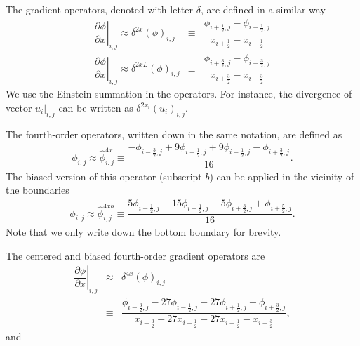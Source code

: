 \documentclass[gmd,manuscript]{copernicus}
\begin{document}
The gradient operators, denoted with letter $\delta$, are defined in a similar way
\begin{eqnarray}
\left. \dfrac{\partial \phi}{\partial x}\right|_{i,j} \approx \delta^{2x} \left( \phi \right)_{i,j} & \equiv & \dfrac{\phi_{i+\frac{1}{2},j} - \phi_{i-\frac{1}{2},j}}
                                                                                                                 {   x_{i+\frac{1}{2}}   -    x_{i-\frac{1}{2}  }} \\
\left. \dfrac{\partial \phi}{\partial x}\right|_{i,j} \approx \delta^{2xL} \left( \phi \right)_{i,j}& \equiv & \dfrac{\phi_{i+\frac{3}{2},j} - \phi_{i-\frac{3}{2},j}}
                                                                                                                  {   x_{i+\frac{3}{2}}   -    x_{i-\frac{3}{2}  }}
\end{eqnarray}
We use the Einstein summation in the operators. For instance, the divergence of vector $\left.u_i\right|_{i,j}$ can be written as $\delta^{2x_i}\left( u_i \right)_{i,j}$.
% 

The fourth-order operators, written down in the same notation, are defined as
\begin{eqnarray}
\phi_{i,j} \approx \widehat{\phi}^{4x}_{i,j} \equiv \dfrac{- \phi_{i-\frac{3}{2},j} + 9 \phi_{i-\frac{1}{2},j} + 9 \phi_{i+\frac{1}{2},j} - \phi_{i+\frac{3}{2},j}}{16}.\label{eq:interp4}
\end{eqnarray}
The biased version of this operator (subscript $b$) can be applied in the vicinity of the boundaries 
\begin{eqnarray}
\phi_{i,j} \approx \widehat{\phi}^{4xb}_{i,j} \equiv \dfrac{ 5 \phi_{i-\frac{1}{2},j} + 15 \phi_{i+\frac{1}{2},j} - 5 \phi_{i+\frac{3}{2},j} + \phi_{i+\frac{5}{2},j}}{16}.
\end{eqnarray}
Note that we only write down the bottom boundary for brevity.

The centered and biased fourth-order gradient operators are
\begin{eqnarray}
\nonumber
\left. \dfrac{\partial \phi}{\partial x}\right|_{i,j} & \approx & \delta^{4x} \left( \phi \right)_{i,j}\\
& \equiv & \dfrac{\phi_{i-\frac{3}{2},j} - 27 \phi_{i-\frac{1}{2},j} + 27 \phi_{i+\frac{1}{2},j} - \phi_{i+\frac{3}{2},j}}
             {       x_{i-\frac{3}{2}}   - 27    x_{i-\frac{1}{2}}   + 27    x_{i+\frac{1}{2}}   -    x_{i+\frac{3}{2}}},
\end{eqnarray}
and
\end{document}
